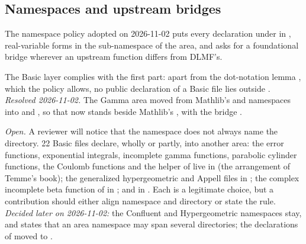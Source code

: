 \documentclass[11pt,a4paper]{article}
\newcommand{\resolved}[1]{\textit{Resolved #1.}}
\newcommand{\open}{\textit{Open.}}
\begin{document}
\subsection{Namespaces and upstream bridges}

The namespace policy adopted on 2026-11-02 puts every declaration under  in
, real-variable forms in the  sub-namespace of the area, and asks
for a foundational bridge wherever an upstream function differs from DLMF's.

The Basic layer complies with the first part: apart from the dot-notation lemma
, which the policy allows, no public
declaration of a Basic file lies outside . \resolved{2026-11-02} The Gamma area moved
from Mathlib's  and  namespaces into  and
, so that  now stands beside Mathlib's
, with the bridge .

\open{} A reviewer will notice that the namespace does not always name the directory. 22 Basic
files declare, wholly or partly, into another area: the error functions, exponential integrals,
incomplete gamma functions, parabolic cylinder functions, the Coulomb functions and the helper
 of  live in
 (the arrangement of Temme's book); the generalized hypergeometric and
Appell files in ; the complex incomplete beta function of
 in ; and
 in . Each is a
legitimate choice, but a contribution should either align namespace and directory or state the
rule. \emph{Decided later on 2026-11-02:} the Confluent and Hypergeometric namespaces stay, and
 states that an area namespace may span several directories; the declarations
of  moved to .
\end{document}
